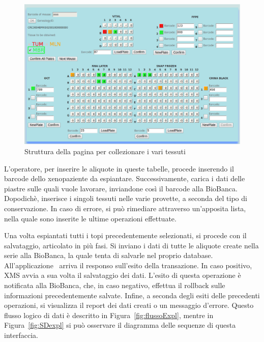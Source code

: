 \begin{figure}[h]
\begin{center}
\includegraphics[width=1.0\textwidth]{./Figure/explantForm}
\end{center}
\caption{Struttura della pagina per collezionare i vari tessuti\label{fig:explForm}}
\end{figure}\newpage

L'operatore, per inserire le aliquote in queste tabelle, procede inserendo il barcode dello xenopaziente da espiantare. Successivamente, carica i dati delle piastre sulle quali vuole lavorare, inviandone cos\`i il barcode alla BioBanca. Dopodich\`e, inserisce i singoli tessuti nelle varie provette, a seconda del tipo di conservazione. In caso di errore, si pu\`o rimediare attraverso un'apposita lista, nella quale sono inserite le ultime operazioni effettuate. 

Una volta espiantati tutti i topi precedentemente selezionati, si procede con il salvataggio, articolato in pi\`u fasi. Si inviano i dati di tutte le aliquote create nella serie alla BioBanca, la quale tenta di salvarle nel proprio database. All'applicazione \Xeno\ arriva il responso sull'esito della transazione. In caso positivo, XMS avvia a sua volta il salvataggio dei dati. L'esito di questa operazione \`e notificata alla BioBanca, che, in caso negativo, effettua il rollback sulle informazioni precedentemente salvate. Infine, a seconda degli esiti delle precedenti operazioni, si visualizza il report dei dati creati o un messaggio d'errore. Questo flusso logico di dati \`e descritto in Figura~\ref{fig:flussoExpl}, mentre in Figura~\ref{fig:SDexpl} si pu\`o osservare il diagramma delle sequenze di questa interfaccia.


